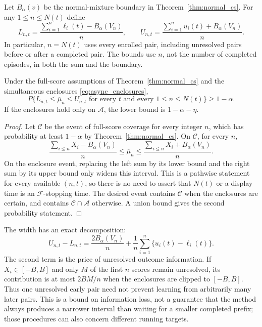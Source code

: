Let $B_\alpha(v)$ be the normal-mixture boundary in
Theorem~\ref{thm:normal_cs}. For any $1\leq n\leq N(t)$ define
\begin{equation}
 L_{n,t}=\frac{\sum_{i=1}^n\ell_i(t)-B_\alpha(V_n)}n,
 \qquad
 U_{n,t}=\frac{\sum_{i=1}^n u_i(t)+B_\alpha(V_n)}n.
 \label{eq:async_cs}
\end{equation}
In particular, $n=N(t)$ uses every enrolled pair, including unresolved
pairs before or after a completed pair. The bounds use $n$, not the
number of completed episodes, in both the sum and the boundary.

\begin{theorem}
\label{thm:async_cs}
Under the full-score assumptions of Theorem~\ref{thm:normal_cs} and
the simultaneous enclosures \eqref{eq:async_enclosures},
\[
 P\{L_{n,t}\leq\overline\mu_n\leq U_{n,t}
       \text{ for every }t\text{ and every }1\leq n\leq N(t)\}
 \geq1-\alpha.
\]
If the enclosures hold only on $\mathcal A$, the lower bound is
$1-\alpha-\eta$.
\end{theorem}
\begin{proof}
Let $\mathcal C$ be the event of full-score coverage for every integer
$n$, which has probability at least $1-\alpha$ by
Theorem~\ref{thm:normal_cs}. On $\mathcal C$, for every $n$,
\[
 \frac{\sum_{i\leq n}X_i-B_\alpha(V_n)}n
 \leq\overline\mu_n\leq
 \frac{\sum_{i\leq n}X_i+B_\alpha(V_n)}n.
\]
On the enclosure event, replacing the left sum by its lower bound and
the right sum by its upper bound only widens this interval. This is a
pathwise statement for every available $(n,t)$, so there is no need to
assert that $N(t)$ or a display time is an $\mathcal F$-stopping time.
The desired event contains $\mathcal C$ when the enclosures are certain,
and contains $\mathcal C\cap\mathcal A$ otherwise. A union bound gives
the second probability statement.
\end{proof}

The width has an exact decomposition:
\begin{equation}
 U_{n,t}-L_{n,t}
 =\frac{2B_\alpha(V_n)}n+
   \frac1n\sum_{i=1}^n\{u_i(t)-\ell_i(t)\}.
 \label{eq:async_width}
\end{equation}
The second term is the price of unresolved outcome information. If
$X_i\in[-B,B]$ and only $M$ of the first $n$ scores remain unresolved,
its contribution is at most $2BM/n$ when the enclosures are clipped to
$[-B,B]$. Thus one unresolved early pair
need not prevent learning from arbitrarily many later pairs.
This is a bound on information loss, not a guarantee that the method
always produces a narrower interval than waiting for a smaller completed
prefix; those procedures can also concern different running targets.

